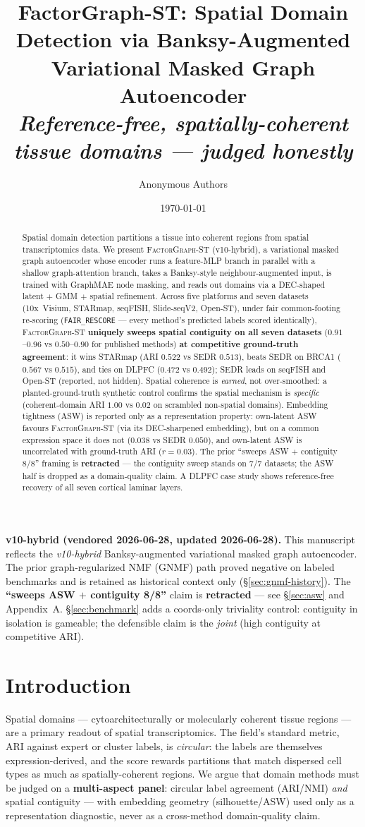 \documentclass[10pt,letterpaper]{article}
\title{FactorGraph-ST: Spatial Domain Detection via Banksy-Augmented\\
Variational Masked Graph Autoencoder\\[0.4em]
\large\itshape Reference-free, spatially-coherent tissue domains --- judged honestly}
\author[1]{Anonymous Authors}
\affil[1]{Author affiliations to be added before submission}
\date{\today}
\newcommand{\versionnote}{%
  \begin{center}\colorbox{fgForest!18}{\parbox{0.9\textwidth}{%
  \textbf{v10-hybrid (vendored 2026-06-28, updated 2026-06-28).} This manuscript reflects the
  \emph{v10-hybrid} Banksy-augmented variational masked graph autoencoder.
  The prior graph-regularized NMF (GNMF) path proved negative on labeled
  benchmarks and is retained as historical context only
  (\S\ref{sec:gnmf-history}). The \textbf{``sweeps ASW $+$ contiguity 8/8''}
  claim is \textbf{retracted} --- see \S\ref{sec:asw} and Appendix~A.
  \S\ref{sec:benchmark} adds a coords-only triviality control: contiguity in
  isolation is gameable; the defensible claim is the \emph{joint} (high
  contiguity at competitive ARI).
  }}\end{center}}
\begin{document}
\maketitle
\versionnote

\begin{abstract}
Spatial domain detection partitions a tissue into coherent regions from spatial
transcriptomics data. We present \textsc{FactorGraph-ST} (v10-hybrid), a variational
masked graph autoencoder whose encoder runs a feature-MLP branch in parallel with a
shallow graph-attention branch, takes a Banksy-style neighbour-augmented input, is
trained with GraphMAE node masking, and reads out domains via a DEC-shaped latent
$+$ GMM $+$ spatial refinement. Across five platforms and seven datasets (10x~Visium,
STARmap, seqFISH, Slide-seqV2, Open-ST), under fair common-footing re-scoring (\texttt{FAIR\_RESCORE}
--- every method's predicted labels scored identically),
\textsc{FactorGraph-ST} \textbf{uniquely sweeps spatial contiguity on all seven
datasets} ($0.91$--$0.96$ vs $0.50$--$0.90$ for published methods) \textbf{at
competitive ground-truth agreement}: it wins STARmap (ARI $0.522$ vs SEDR $0.513$),
beats SEDR on BRCA1 ($0.567$ vs $0.515$), and ties on DLPFC ($0.472$ vs $0.492$);
SEDR leads on seqFISH and Open-ST (reported, not hidden). Spatial coherence is
\emph{earned}, not over-smoothed: a planted-ground-truth synthetic control confirms the
spatial mechanism is \emph{specific} (coherent-domain ARI $1.00$ vs $0.02$ on scrambled
non-spatial domains). Embedding tightness (ASW) is reported only as a representation
property: own-latent ASW favours \textsc{FactorGraph-ST} (via its DEC-sharpened
embedding), but on a common expression space it does not ($0.038$ vs SEDR $0.050$), and
own-latent ASW is uncorrelated with ground-truth ARI ($r{=}0.03$). The prior
``sweeps ASW $+$ contiguity 8/8'' framing is \textbf{retracted} --- the contiguity
sweep stands on 7/7 datasets; the ASW half is dropped as a domain-quality claim.
A DLPFC case study shows reference-free recovery of all seven cortical laminar layers.
\end{abstract}

\section{Introduction}
\label{sec:intro}

Spatial domains --- cytoarchitecturally or molecularly coherent tissue regions --- are a
primary readout of spatial transcriptomics. The field's standard metric, ARI against expert
or cluster labels, is \emph{circular}: the labels are themselves expression-derived, and the
score rewards partitions that match dispersed cell types as much as spatially-coherent
regions. We argue that domain methods must be judged on a \textbf{multi-aspect panel}:
circular label agreement (ARI/NMI) \emph{and} spatial contiguity --- with embedding
geometry (silhouette/ASW) used only as a representation diagnostic, never as a cross-method
domain-quality claim.
\end{document}
